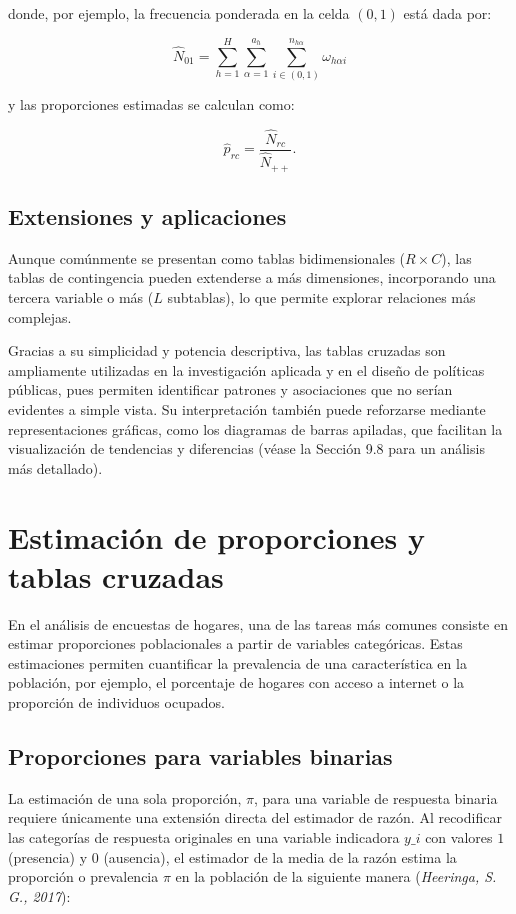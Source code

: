 \documentclass[
  12pt,
]{book}
\begin{document}
donde, por ejemplo, la frecuencia ponderada en la celda \((0,1)\) está dada por:

\[
\hat{N}_{01} = \sum_{h=1}^{H} \sum_{\alpha=1}^{a_{h}} \sum_{i \in (0,1)}^{n_{h\alpha}} \omega_{h\alpha i}
\]

y las proporciones estimadas se calculan como:

\[
\hat{p}_{rc}=\frac{\hat{N}_{rc}}{\hat{N}_{++}}.
\]

\subsection{Extensiones y aplicaciones}\label{extensiones-y-aplicaciones}

Aunque comúnmente se presentan como tablas bidimensionales (\(R \times C\)), las tablas de contingencia pueden extenderse a más dimensiones, incorporando una tercera variable o más (\(L\) subtablas), lo que permite explorar relaciones más complejas.

Gracias a su simplicidad y potencia descriptiva, las tablas cruzadas son ampliamente utilizadas en la investigación aplicada y en el diseño de políticas públicas, pues permiten identificar patrones y asociaciones que no serían evidentes a simple vista. Su interpretación también puede reforzarse mediante representaciones gráficas, como los diagramas de barras apiladas, que facilitan la visualización de tendencias y diferencias (véase la Sección 9.8 para un análisis más detallado).

\section{Estimación de proporciones y tablas cruzadas}\label{estimaciuxf3n-de-proporciones-y-tablas-cruzadas}

En el análisis de encuestas de hogares, una de las tareas más comunes consiste en estimar proporciones poblacionales a partir de variables categóricas. Estas estimaciones permiten cuantificar la prevalencia de una característica en la población, por ejemplo, el porcentaje de hogares con acceso a internet o la proporción de individuos ocupados.

\subsection{Proporciones para variables binarias}\label{proporciones-para-variables-binarias}

La estimación de una sola proporción, \(\pi\), para una variable de respuesta binaria requiere únicamente una extensión directa del estimador de razón. Al recodificar las categorías de respuesta originales en una variable indicadora \(y\_{i}\) con valores \(1\) (presencia) y \(0\) (ausencia), el estimador de la media de la razón estima la proporción o prevalencia \(\pi\) en la población de la siguiente manera (\emph{Heeringa, S. G., 2017}):
\end{document}
